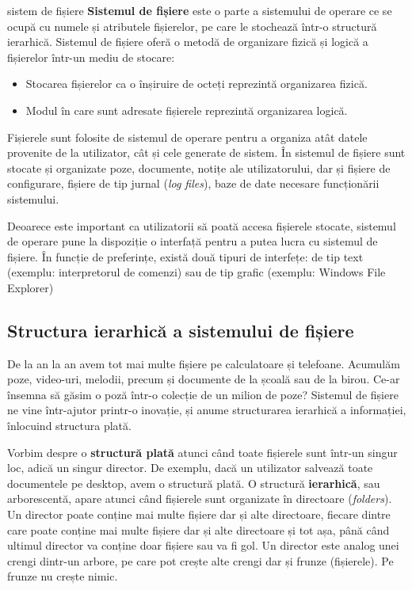 \begin{definition}{sistem de fișiere}
\textbf{Sistemul de fișiere} este o parte a sistemului de operare ce se ocupă cu
numele și atributele fișierelor, pe care le stochează într-o structură
ierarhică. Sistemul de fișiere oferă o metodă de organizare fizică și logică a
fișierelor într-un mediu de stocare:

\begin{itemize}
	\item Stocarea fișierelor ca o înșiruire de octeți reprezintă
		organizarea fizică.
	\item Modul în care sunt adresate fișierele reprezintă organizarea
		logică.
\end{itemize}
\end{definition}

Fișierele sunt folosite de sistemul de operare pentru a organiza atât
datele provenite de la utilizator, cât și cele generate de sistem. În sistemul de fișiere sunt stocate și organizate poze, documente, notițe ale utilizatorului, dar și fișiere de configurare, fișiere de tip jurnal (\textit{log files}), baze de date necesare funcționării sistemului.

Deoarece este important ca utilizatorii să poată accesa fișierele stocate,
sistemul de operare pune la dispoziție o interfață pentru a putea lucra cu
sistemul de fișiere. În funcție de preferințe, există două tipuri de interfețe:
de tip text (exemplu: interpretorul de comenzi) sau de tip grafic (exemplu:
Windows File Explorer)

\subsection{Structura ierarhică a sistemului de fișiere}
\label{sec:file-system-baza-struct}

De la an la an avem tot mai multe fișiere pe calculatoare și telefoane. Acumulăm
poze, video-uri, melodii, precum și documente de la școală sau de la birou.
Ce-ar însemna să găsim o poză într-o colecție de un milion de poze? Sistemul de
fișiere ne vine într-ajutor printr-o inovație, și anume structurarea ierarhică a
informației, înlocuind structura plată.

Vorbim despre o \textbf{structură plată} atunci când toate fișierele sunt
într-un singur loc, adică un singur director. De exemplu, dacă un utilizator
salvează toate documentele pe desktop, avem o structură plată. O structură
\textbf{ierarhică}, sau arborescentă, apare atunci când fișierele sunt
organizate în directoare (\textit{folders}). Un director poate conține mai
multe fișiere dar și alte directoare, fiecare dintre care poate conține mai
multe fișiere dar și alte directoare și tot așa, până când ultimul director va
conține doar fișiere sau va fi gol. Un director este analog unei crengi dintr-un
arbore, pe care pot crește alte crengi dar și frunze (fișierele). Pe frunze nu
crește nimic.

